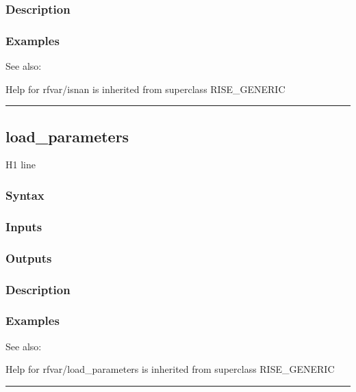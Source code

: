 \documentclass[letterpaper,10pt,english]{sphinxmanual}
\begin{document}
\subsubsection{Description}
\label{classes/models/@rfvar/rfvar:id46}

\subsubsection{Examples}
\label{classes/models/@rfvar/rfvar:id47}
See also:

Help for rfvar/isnan is inherited from superclass RISE\_GENERIC


\bigskip\hrule{}\bigskip



\subsection{load\_parameters}
\label{classes/models/@rfvar/rfvar:load-parameters}\label{classes/models/@rfvar/rfvar:id48}
H1 line


\subsubsection{Syntax}
\label{classes/models/@rfvar/rfvar:id49}

\subsubsection{Inputs}
\label{classes/models/@rfvar/rfvar:id50}

\subsubsection{Outputs}
\label{classes/models/@rfvar/rfvar:id51}

\subsubsection{Description}
\label{classes/models/@rfvar/rfvar:id52}

\subsubsection{Examples}
\label{classes/models/@rfvar/rfvar:id53}
See also:

Help for rfvar/load\_parameters is inherited from superclass RISE\_GENERIC


\bigskip\hrule{}\bigskip
\end{document}
